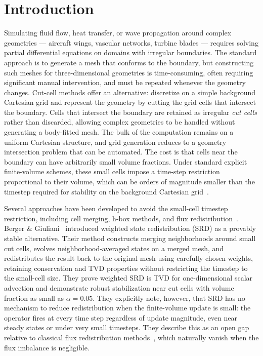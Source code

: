 \documentclass[11pt]{article}
\begin{document}
\section{Introduction}
Simulating fluid flow, heat transfer, or wave propagation around complex 
geometries --- aircraft wings, vascular networks, turbine blades --- requires 
solving partial differential equations on domains with irregular boundaries. 
The standard approach is to generate a mesh that conforms to the boundary, 
but constructing such meshes for three-dimensional geometries is 
time-consuming, often requiring significant manual intervention, and must be 
repeated whenever the geometry changes. Cut-cell methods offer an alternative: 
discretize on a simple background Cartesian grid and represent the geometry 
by cutting the grid cells that intersect the boundary. Cells that intersect 
the boundary are retained as irregular \emph{cut cells} rather than discarded, 
allowing complex geometries to be handled without generating a body-fitted 
mesh. The bulk of the computation remains on a uniform Cartesian structure, 
and grid generation reduces to a geometry intersection problem that can be 
automated. The cost is that cells near the boundary can have arbitrarily small 
volume fractions. Under standard explicit finite-volume schemes, these small 
cells impose a time-step restriction proportional to their volume, which can 
be orders of magnitude smaller than the timestep required for stability on 
the background Cartesian grid~\cite{colella1998,quirk1994}.

Several approaches have been developed to avoid the small-cell timestep 
restriction, including cell merging, h-box methods, and flux 
redistribution~\cite{colella2006,berger1989}. Berger \& Giuliani~\cite{berger2024} 
introduced weighted state redistribution (SRD) as a provably stable 
alternative. Their method constructs merging neighborhoods around small cut 
cells, evolves neighborhood-averaged states on a merged mesh, and 
redistributes the result back to the original mesh using carefully chosen 
weights, retaining conservation and TVD properties without restricting the 
timestep to the small-cell size. They prove weighted SRD is TVD for 
one-dimensional scalar advection and demonstrate robust stabilization near 
cut cells with volume fraction as small as $\alpha = 0.05$. They explicitly 
note, however, that SRD has no mechanism to reduce redistribution when the 
finite-volume update is small: the operator fires at every time step 
regardless of update magnitude, even near steady states or under very small 
timesteps. They describe this as an open gap relative to classical flux 
redistribution methods~\cite{colella2006,berger1989}, which naturally vanish 
when the flux imbalance is negligible.
\end{document}
